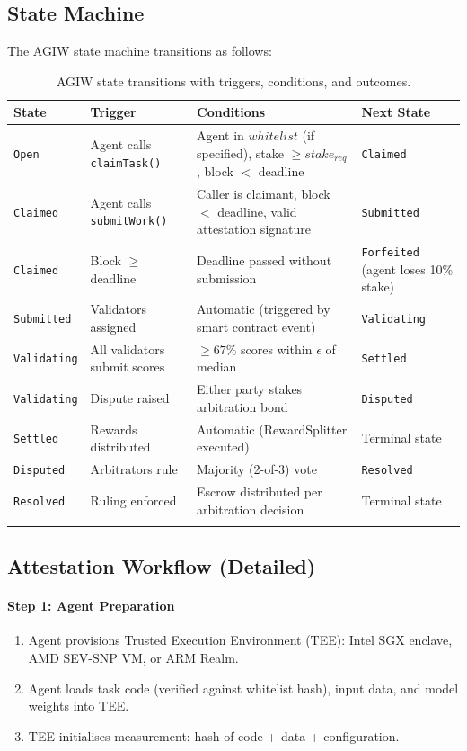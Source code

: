 \documentclass[11pt]{article}
\begin{document}
\subsection{State Machine}
\label{sec:agiw-state-machine}
The AGIW state machine transitions as follows:
\begin{longtable}{@{}p{}p{}p{}p{}@{}}
\toprule
\textbf{State} & \textbf{Trigger} & \textbf{Conditions} & \textbf{Next State} \\\midrule
\texttt{Open} & Agent calls \texttt{claimTask()} & Agent in $whitelist$ (if specified), stake $\geq stake_{req}$, block $<$ deadline & \texttt{Claimed} \\
\texttt{Claimed} & Agent calls \texttt{submitWork()} & Caller is claimant, block $<$ deadline, valid attestation signature & \texttt{Submitted} \\
\texttt{Claimed} & Block $\geq$ deadline & Deadline passed without submission & \texttt{Forfeited} (agent loses 10\% stake) \\
\texttt{Submitted} & Validators assigned & Automatic (triggered by smart contract event) & \texttt{Validating} \\
\texttt{Validating} & All validators submit scores & $\geq 67\%$ scores within $\epsilon$ of median & \texttt{Settled} \\
\texttt{Validating} & Dispute raised & Either party stakes arbitration bond & \texttt{Disputed} \\
\texttt{Settled} & Rewards distributed & Automatic (RewardSplitter executed) & Terminal state \\
\texttt{Disputed} & Arbitrators rule & Majority (2-of-3) vote & \texttt{Resolved} \\
\texttt{Resolved} & Ruling enforced & Escrow distributed per arbitration decision & Terminal state \\\bottomrule
\caption{AGIW state transitions with triggers, conditions, and outcomes.}
\label{tab:agiw-states}
\end{longtable}

\subsection{Attestation Workflow (Detailed)}
\label{sec:attestation-workflow}
\paragraph{Step 1: Agent Preparation}
\begin{enumerate}[noitemsep]
  \item Agent provisions Trusted Execution Environment (TEE): Intel SGX enclave, AMD SEV-SNP VM, or ARM Realm.
  \item Agent loads task code (verified against whitelist hash), input data, and model weights into TEE.
  \item TEE initialises measurement: hash of code + data + configuration.
\end{enumerate}
\end{document}
